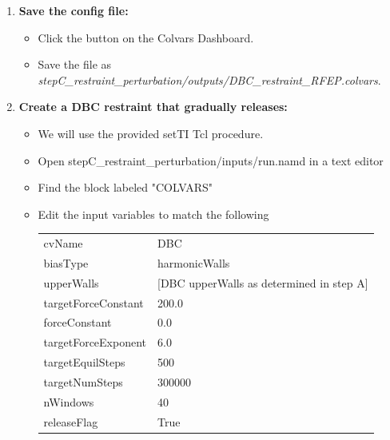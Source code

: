 \documentclass[9pt,tutorial]{Styling/livecoms}
\newcommand{\filepath}[1]{\textit{#1}}
\newcommand{\button}[1]{
  \inlineBox[gray]{\texttt{#1}}
}
\begin{document}
\begin{enumerate}[label=\arabic*.]
\begin{enumerate}[label=\alph*., ref=\theenumi.\alph*]
            \item \textbf{Save the config file:}
            \begin{itemize}
                \item Click the \button{Save} button on the Colvars Dashboard.
                \item Save the file as \filepath{stepC\_restraint\_perturbation/outputs/DBC\_restraint\_RFEP.colvars}.
            \end{itemize}
        \item \textbf{Create a DBC restraint that gradually releases:} 
            \begin{itemize}
            \item We will use the provided setTI Tcl procedure.
            \item Open stepC\_restraint\_perturbation/inputs/run.namd in a text editor
            \item Find the block labeled "COLVARS"
            \item Edit the input variables to match the following\\
            { \ttfamily
            \begin{tabular}{l l}
                cvName & DBC\\
                biasType & harmonicWalls\\
                upperWalls & [DBC upperWalls as determined in step A]\\
                targetForceConstant & 200.0\\
                forceConstant & 0.0\\
                targetForceExponent & 6.0\\
                targetEquilSteps & 500\\
                targetNumSteps & 300000\\
                nWindows & 40\\
                releaseFlag & True
            \end{tabular} }
            \end{itemize}
        \end{enumerate}
        

\end{enumerate}
\end{document}
